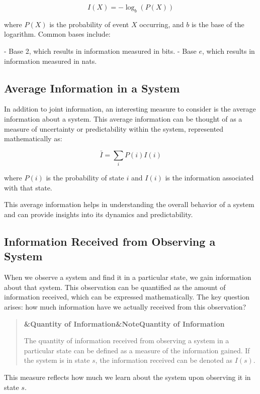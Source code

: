 \documentclass[a4paper]{article}
\newcommand{\boxheading}[1]{%
  \par\smallskip
  \noindent\textbf{\ifx&#1&Note\else#1\fi}\par
  \smallskip
}
\newenvironment{defbox}[1][]{%
  \begin{quote}\color{green!40!black}\boxheading{#1}\normalcolor
}{\end{quote}}
\begin{document}
\begin{equation}
I(X) = -\log_b(P(X))
\end{equation}

where \(P(X)\) is the probability of event \(X\) occurring, and \(b\) is the base of the logarithm. Common bases include:

- Base 2, which results in information measured in bits.
- Base \(e\), which results in information measured in nats.

\subsection{Average Information in a System}
In addition to joint information, an interesting measure to consider is the average information about a system. This average information can be thought of as a measure of uncertainty or predictability within the system, represented mathematically as:

\begin{equation}
\bar{I} = \sum_{i} P(i) I(i)
\end{equation}

where \(P(i)\) is the probability of state \(i\) and \(I(i)\) is the information associated with that state.

This average information helps in understanding the overall behavior of a system and can provide insights into its dynamics and predictability.

\subsection{Information Received from Observing a System}
When we observe a system and find it in a particular state, we gain information about that system. This observation can be quantified as the amount of information received, which can be expressed mathematically. The key question arises: how much information have we actually received from this observation?

\begin{defbox}[Quantity of Information]
The quantity of information received from observing a system in a particular state can be defined as a measure of the information gained. If the system is in state \(s\), the information received can be denoted as \(I(s)\).
\end{defbox}

This measure reflects how much we learn about the system upon observing it in state \(s\). 
\end{document}
